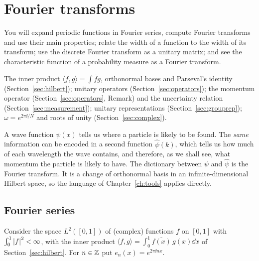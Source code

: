 \section{Fourier transforms}\label{sec:fourier}

\begin{objectives}
  You will expand periodic functions in Fourier series, compute Fourier transforms and use their main properties; relate the width of a function to the width of its transform;
  use the discrete Fourier transform as a unitary matrix; and see the characteristic function of a probability measure as a Fourier transform.
\end{objectives}

\begin{recall}
  The inner product $\langle f,g\rangle=\int\overline fg$, orthonormal bases and Parseval's identity (Section~\ref{sec:hilbert}); unitary operators (Section~\ref{sec:operators}); the momentum operator (Section~\ref{sec:operators}, Remark) and the uncertainty relation (Section~\ref{sec:measurement}); unitary representations (Section~\ref{sec:grouprep}); $\omega=e^{2\pi\ii/N}$ and roots of unity (Section~\ref{sec:complex}).
\end{recall}

A wave function $\psi(x)$ tells us where a particle is likely to be found. The \emph{same} information can be encoded in a second function $\hat\psi(k)$, which tells us how much of each wavelength the wave contains, and therefore, as we shall see, what momentum
the particle is likely to have. The dictionary between $\psi$ and $\hat\psi$ is the Fourier transform. It is a change of orthonormal basis in an infinite-dimensional Hilbert space, so the language of Chapter~\ref{ch:tools} applies directly.

\subsection{Fourier series}

Consider the space $L^2([0,1])$ of (complex) functions $f$ on $[0,1]$ with $\int_0^1\left|f\right|^2<\infty$, with the inner product $\langle f,g\rangle=\int_0^1\overline{f(x)}\,g(x)\dd x$ of Section~\ref{sec:hilbert}. For $n\in\mathbb{Z}$ put $e_n(x)=e^{2\pi\ii nx}$.

